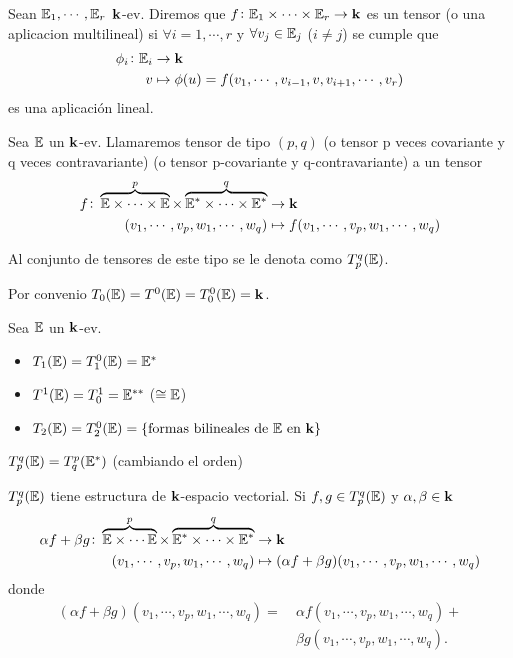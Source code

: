 \begin{defi}
	Sean $\mathbb{E}_1,\cdots , \mathbb{E}_r$ $\mathbf{k}$-ev. Diremos que
	$f \colon \mathbb{E}_1 \times \cdots \times \mathbb{E}_r \to \mathbf{k}$ es un tensor (o una aplicacion
	multilineal) si $\forall i=1,\cdots , r$ y $\forall v_j \in \mathbb{E}_j$ ($i \neq j$)
	se cumple que
	\[
		 \begin{aligned}
			 \phi_i \colon \mathbb{E}_i &\to \mathbf{k} \\
			 v &\mapsto \phi(u)=f(v_1,\cdots , v_{i-1}, v, v_{i+1}, \cdots , v_r)
		 \end{aligned}
	\]
	es una aplicación lineal.
\end{defi}
\begin{defi}
	Sea $\mathbb{E}$ un $\mathbf{k}$-ev. Llamaremos tensor de tipo $(p,q)$ (o tensor p veces
	covariante y q veces contravariante) (o tensor p-covariante y q-contravariante)
	a un tensor
	\[
		\begin{aligned}
			f \colon \overbrace{\mathbb{E} \times \cdots \times \mathbb{E}}^p\times
			\overbrace{\mathbb{E}^* \times \cdots \times \mathbb{E}^*}^q&\to \mathbf{k} \\
			(v_1, \cdots, v_p, w_1, \cdots, w_q) &\mapsto
			f(v_1,\cdots,v_p,w_1,\cdots,w_q)
		\end{aligned}
	\]
\end{defi}
\begin{obs}
	Al conjunto de tensores  de este tipo se le denota como $T_p^q(\mathbb{E})$.
\end{obs}
\begin{obs}
	Por convenio $T_0(\mathbb{E}) = T^0(\mathbb{E}) = T_0^0(\mathbb{E}) = \mathbf{k}$.
\end{obs}
\begin{example}
	Sea $\mathbb{E}$ un $\mathbf{k}$-ev.
	\begin{itemize}
		\item $T_1(\mathbb{E}) = T_1^0(\mathbb{E}) = \mathbb{E}^*$
		\item $T^1(\mathbb{E}) = T_0^1 = \mathbb{E}^{**}$ ($\cong \mathbb{E}$)
		\item $T_2(\mathbb{E}) = T_2^0(\mathbb{E}) = \{\text{formas bilineales de } \mathbb{E} \text{ en } \mathbf{k}\}$
	\end{itemize}
\end{example}
\begin{prop}
	$T_p^q(\mathbb{E}) = T_q^p(\mathbb{E}^*)$ (cambiando el orden)
\end{prop}
\begin{prop}
	$T_p^q(\mathbb{E})$ tiene estructura de $\mathbf{k}$-espacio vectorial. Si $f, g \in T_p^q(\mathbb{E})$ y
	$\alpha , \beta \in \mathbf{k}$
	\[
		\begin{aligned}
			\alpha f + \beta g \colon \overbrace{\mathbb{E} \times \cdots \mathbb{E}}^p \times
			\overbrace{\mathbb{E}^* \times \cdots \times \mathbb{E}^*}^q &\to \mathbf{k} \\
			(v_1, \cdots, v_p, w_1, \cdots, w_q) &\mapsto (\alpha f + \beta g)
			(v_1, \cdots, v_p, w_1, \cdots, w_q)
		\end{aligned}
	\]
	donde
	\[
	\begin{aligned}
	(\alpha f + \beta g) (v_1, \cdots, v_p, w_1, \cdots, w_q) = \
	&\alpha f(v_1, \cdots, v_p, w_1, \cdots, w_q) + \\
	&\beta g(v_1, \cdots, v_p, w_1, \cdots, w_q).
	\end{aligned}
	\]
\end{prop}
